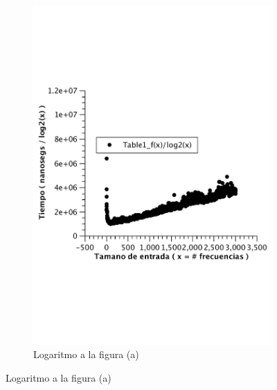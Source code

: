 \begin{figure}[H]
\begin{subfigure}[b]{0.5\textwidth}
                \includegraphics[width=\textwidth]{imagenes/af-rand-lineal.pdf}
                \caption{Logaritmo a la figura (a)}
        \end{subfigure}
        

\end{figure}
